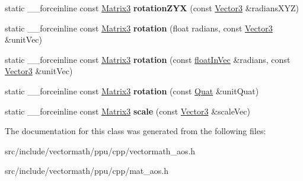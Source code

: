 \begin{DoxyCompactItemize}
\item 
\hypertarget{classVectormath_1_1Aos_1_1Matrix3_aa8b17add8626797be242c504439dfa25}{static \-\_\-\-\_\-forceinline const \hyperlink{classVectormath_1_1Aos_1_1Matrix3}{Matrix3} {\bfseries rotation\-Z\-Y\-X} (const \hyperlink{classVectormath_1_1Aos_1_1Vector3}{Vector3} \&radians\-X\-Y\-Z)}\label{classVectormath_1_1Aos_1_1Matrix3_aa8b17add8626797be242c504439dfa25}

\item 
\hypertarget{classVectormath_1_1Aos_1_1Matrix3_ab861fcd0ca97786e39b39fda8d431777}{static \-\_\-\-\_\-forceinline const \hyperlink{classVectormath_1_1Aos_1_1Matrix3}{Matrix3} {\bfseries rotation} (float radians, const \hyperlink{classVectormath_1_1Aos_1_1Vector3}{Vector3} \&unit\-Vec)}\label{classVectormath_1_1Aos_1_1Matrix3_ab861fcd0ca97786e39b39fda8d431777}

\item 
\hypertarget{classVectormath_1_1Aos_1_1Matrix3_ad171c46dd0964a4a0801ef5504d248f4}{static \-\_\-\-\_\-forceinline const \hyperlink{classVectormath_1_1Aos_1_1Matrix3}{Matrix3} {\bfseries rotation} (const \hyperlink{classVectormath_1_1floatInVec}{float\-In\-Vec} \&radians, const \hyperlink{classVectormath_1_1Aos_1_1Vector3}{Vector3} \&unit\-Vec)}\label{classVectormath_1_1Aos_1_1Matrix3_ad171c46dd0964a4a0801ef5504d248f4}

\item 
\hypertarget{classVectormath_1_1Aos_1_1Matrix3_a57a86f92969694a2fdf85e7088c5e331}{static \-\_\-\-\_\-forceinline const \hyperlink{classVectormath_1_1Aos_1_1Matrix3}{Matrix3} {\bfseries rotation} (const \hyperlink{classVectormath_1_1Aos_1_1Quat}{Quat} \&unit\-Quat)}\label{classVectormath_1_1Aos_1_1Matrix3_a57a86f92969694a2fdf85e7088c5e331}

\item 
\hypertarget{classVectormath_1_1Aos_1_1Matrix3_a28aa3a199ae46660d1566c34f1fc3626}{static \-\_\-\-\_\-forceinline const \hyperlink{classVectormath_1_1Aos_1_1Matrix3}{Matrix3} {\bfseries scale} (const \hyperlink{classVectormath_1_1Aos_1_1Vector3}{Vector3} \&scale\-Vec)}\label{classVectormath_1_1Aos_1_1Matrix3_a28aa3a199ae46660d1566c34f1fc3626}

\end{DoxyCompactItemize}


The documentation for this class was generated from the following files\-:\begin{DoxyCompactItemize}
\item 
src/include/vectormath/ppu/cpp/vectormath\-\_\-aos.\-h\item 
src/include/vectormath/ppu/cpp/mat\-\_\-aos.\-h\end{DoxyCompactItemize}
